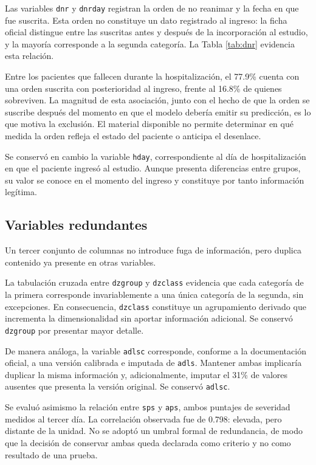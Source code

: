 \documentclass[11pt]{article}
\begin{document}
Las variables \texttt{dnr} y \texttt{dnrday} registran la orden de no reanimar y la fecha en que
fue suscrita. Esta orden no constituye un dato registrado al ingreso: la ficha
oficial distingue entre las suscritas antes y después de la incorporación al estudio, y la mayoría
corresponde a la segunda categoría. La Tabla \ref{tab:dnr} evidencia esta relación.



Entre los pacientes que fallecen durante la hospitalización, el 77.9\% cuenta con una orden
suscrita con posterioridad al ingreso, frente al 16.8\% de quienes sobreviven. La magnitud de esta asociación, junto con el
hecho de que la orden se suscribe después del momento en que el modelo debería emitir su
predicción, es lo que motiva la exclusión. El material disponible no permite determinar en qué
medida la orden refleja el estado del paciente o anticipa el desenlace.

Se conservó en cambio la variable \texttt{hday}, correspondiente al día de hospitalización en que
el paciente ingresó al estudio. Aunque presenta diferencias entre grupos, su valor se conoce en el
momento del ingreso y constituye por tanto información legítima.

\subsection{Variables redundantes}

Un tercer conjunto de columnas no introduce fuga de información, pero duplica contenido ya
presente en otras variables.

La tabulación cruzada entre \texttt{dzgroup} y \texttt{dzclass} evidencia que cada categoría de la
primera corresponde invariablemente a una única categoría de la segunda, sin excepciones. En
consecuencia, \texttt{dzclass} constituye un agrupamiento derivado que incrementa la
dimensionalidad sin aportar información adicional. Se conservó \texttt{dzgroup} por presentar
mayor detalle.

De manera análoga, la variable \texttt{adlsc} corresponde, conforme a la documentación oficial, a
una versión calibrada e imputada de \texttt{adls}. Mantener ambas implicaría duplicar la misma
información y, adicionalmente, imputar el 31\% de valores ausentes que presenta la versión
original. Se conservó \texttt{adlsc}.

Se evaluó asimismo la relación entre \texttt{sps} y \texttt{aps}, ambos puntajes de severidad
medidos al tercer día. La correlación observada fue de 0.798: elevada, pero distante de la
unidad. No se adoptó un umbral formal de redundancia, de modo que la decisión de conservar ambas
queda declarada como criterio y no como resultado de una prueba.
\end{document}
